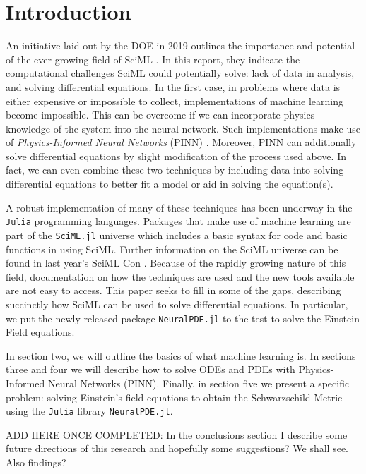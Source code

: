\documentclass{CUP-JNL-DTM}%
\theoremstyle{definition}
\numberwithin{equation}{section}
\newcommand{\Julia}{\texttt{Julia} }
\begin{document}
\section{Introduction}

An initiative laid out by the DOE in 2019 outlines the importance and potential of the ever growing field of SciML \cite{bakerWorkshopReportBasic2019}. In this report, they indicate the computational challenges SciML could potentially solve: lack of data in analysis, and solving differential equations. In the first case, in problems where data is either expensive or impossible to collect, implementations of machine learning become impossible. This can be overcome if we can incorporate physics knowledge of the system into the neural network. Such implementations make use of \emph{Physics-Informed Neural Networks} (PINN) \cite{karniadakisPhysicsinformedMachineLearning2021}. Moreover, PINN can additionally solve differential equations by slight modification of the process used above. In fact, we can even combine these two techniques by including data into solving differential equations to better fit a model or aid in solving the equation(s). 

A robust implementation of many of these techniques has been underway in the \Julia programming languages. Packages that make use of machine learning are part of the \texttt{SciML.jl} universe which includes a basic syntax for code and basic functions in using SciML. Further information on the SciML universe can be found in last year's SciML Con \cite{SciMLCon2022}. Because of the rapidly growing nature of this field, documentation on how the techniques are used and the new tools available are not easy to access. This paper seeks to fill in some of the gaps, describing succinctly how SciML can be used to solve differential equations. In particular, we put the newly-released package \texttt{NeuralPDE.jl} to the test to solve the Einstein Field equations. 

In section two, we will outline the basics of what machine learning is. In sections three and four we will describe how to solve ODEs and PDEs with Physics-Informed Neural Networks (PINN). Finally, in section five we present a specific problem: solving Einstein's field equations to obtain the Schwarzschild Metric using the \Julia library \texttt{NeuralPDE.jl}. 

ADD HERE ONCE COMPLETED:
In the conclusions section I describe some future directions of this research and hopefully some suggestions? We shall see. Also findings?
\end{document}
